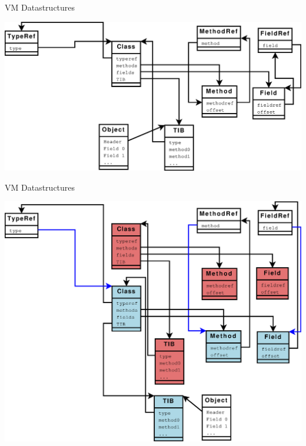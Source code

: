 \begin{frame}{VM Datastructures}%
\begin{center}
\includegraphics[width=0.84\paperwidth]{jvolve/vm-datastructures}
\end{center}
\end{frame}

\begin{frame}{VM Datastructures}%
\begin{center}
\includegraphics[width=0.84\paperwidth,height=0.7\paperheight]{jvolve/vm-datastructures-after-dsu}
\end{center}
\end{frame}

